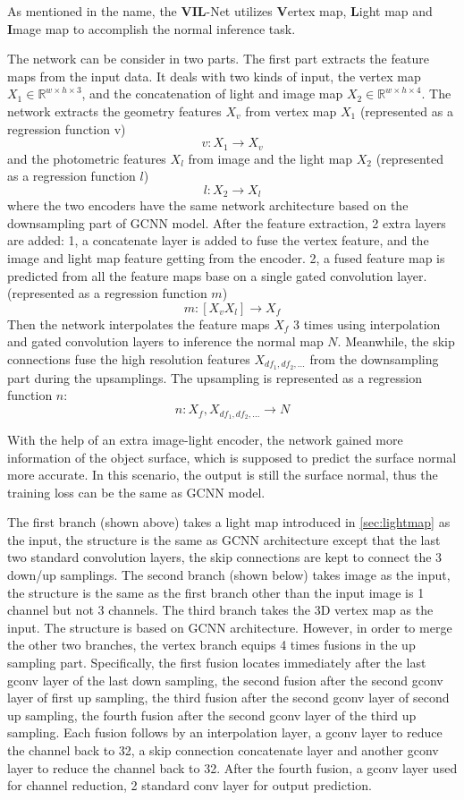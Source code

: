 \documentclass[border=15pt, multi, tikz]{article}
\begin{document}
As mentioned in the name, the \textbf{VIL}-Net utilizes \textbf{V}ertex map, \textbf{L}ight map and \textbf{I}mage map to accomplish the normal inference task. 

The network can be consider in two parts. The first part extracts the feature maps from the input data. It deals with two kinds of input, the vertex map $ X_1 \in \mathbb{R}^{w\times h\times3}$, and the concatenation of light and image map $ X_2 \in \mathbb{R}^{w\times h\times4} $. The network extracts the geometry features $ X_v $ from vertex map $ X_1 $ (represented as a regression function v)
\[ v: X_1 \rightarrow X_v \]
and the photometric features $ X_l $ from image and the light map $ X_2 $ (represented as a regression function $ l $)
\[ l: X_2 \rightarrow X_l \]
where the two encoders have the same network architecture based on the downsampling part of GCNN model. After the feature extraction, 2 extra layers are added: 1, a concatenate layer is added to fuse the vertex feature, and the image and light map feature getting from the encoder. 
2, a fused feature map is predicted from all the feature maps base on a single gated convolution layer. (represented as a regression function $ m $)
\[ m: [X_v X_l] \rightarrow X_f \]
Then the network interpolates the feature maps $ X_f $ 3 times using interpolation and gated convolution layers to inference the normal map $ N $. Meanwhile, the skip connections fuse the high resolution features $ X_{df_1, df_2, ...} $ from the downsampling part during the upsamplings. The upsampling is represented as a regression function $ n $:
\[ n: X_f, X_{df_1, df_2, ...} \rightarrow N \]

With the help of an extra image-light encoder, the network gained more information of the object surface, which is supposed to predict the surface normal more accurate. In this scenario, the output is still the surface normal, thus the training loss can be the same as GCNN model.




The first branch (shown above) takes a light map introduced in \ref{sec:lightmap} as the input, the structure is the same as GCNN architecture except that the last two standard convolution layers, the skip connections are kept to connect the 3 down/up samplings. 
The second branch (shown below) takes image as the input, the structure is the same as the first branch other than the input image is 1 channel but not 3 channels. 
The third branch takes the 3D vertex map as the input. The structure is based on GCNN architecture. However, in order to merge the other two branches, the vertex branch equips 4 times fusions in the up sampling part. Specifically, the first fusion locates immediately after the last gconv layer of the last down sampling, the second fusion after the second gconv layer of first up sampling, the third fusion after the second gconv layer of second up sampling, the fourth fusion after the second gconv layer of the third up sampling. Each fusion follows by an interpolation layer, a gconv layer to reduce the channel back to 32, a skip connection concatenate layer and another gconv layer to reduce the channel back to 32. After the fourth fusion, a gconv layer used for channel reduction, 2 standard conv layer for output prediction.
\end{document}
